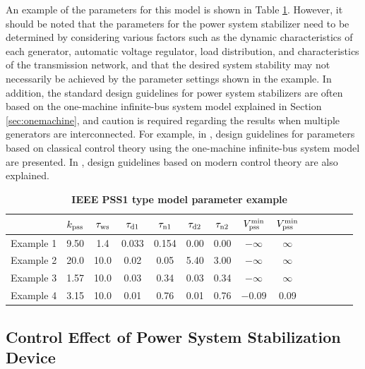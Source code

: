 \documentclass[graybox, envcountchap]{svmult}
\begin{document}
An example of the parameters for this model is shown in Table
\ref{table:psspara}. However, it should be noted that the parameters for the
power system stabilizer need to be determined by considering various factors
such as the dynamic characteristics of each generator, automatic voltage
regulator, load distribution, and characteristics of the transmission network,
and that the desired system stability may not necessarily be achieved by the
parameter settings shown in the example. In addition, the standard design
guidelines for power system stabilizers are often based on the one-machine
infinite-bus system model explained in Section \ref{sec:onemachine}, and caution
is required regarding the results when multiple generators are interconnected.
For example, in \cite[Section 12.5]{kundur1994power}, design guidelines for
parameters based on classical control theory using the one-machine infinite-bus
system model are presented.  In \cite{chow2004power}, design guidelines based on
modern control theory are also explained.

\begin{table}[h]
\medskip
 \caption{\textbf{IEEE PSS1 type model parameter example}}
 \label{table:psspara}
 \centering
  \begin{tabular}{lccccccccccccc}
   \hline
 &  $k_{\rm pss}$ & $\tau_{\rm ws}$ & $\tau_{{\rm d}1}$ & $\tau_{{\rm n}1}$ & $\tau_{{\rm d}2}$ & $\tau_{{\rm n}2}$ & $V_{\rm pss}^{\rm min}$ & $V_{\rm pss}^{\rm min}$ \\
   \hline \hline
   Example 1 \cite[Section 12.5]{kundur1994power}& 9.50 & 1.4 & 0.033 & 0.154 & 0.00 & 0.00 & $-\infty$ & $\infty$ \\
   Example 2 \cite[Section 12.8]{kundur1994power}& 20.0 & 10.0 & 0.02 & 0.05 & 5.40 & 3.00 & $-\infty$ & $\infty$ \\
   Example 3 \cite[Section III]{chow2004power}& 1.57 & 10.0 & 0.03 & 0.34 & 0.03 & 0.34 & $-\infty$ & $\infty$ \\
   Example 4 \cite[Table H.3]{ieee2016ieee}& 3.15 & 10.0 & 0.01 & 0.76 & 0.01 & 0.76 & $-0.09$ & 0.09\\
   \hline
  \end{tabular}
\end{table}

\subsection{Control Effect of Power System Stabilization Device}\label{sec:pssov}
\end{document}
